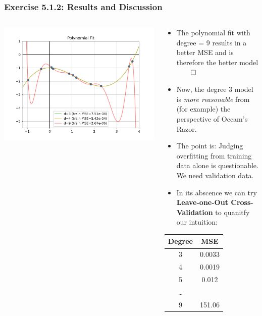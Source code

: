 \documentclass[10pt,aspectratio=169,handout]{beamer}
\begin{document}
\begin{frame}
    \frametitle{Exercise 5.1.2: Results and Discussion}

    \begin{columns}
    \begin{column}{0.4\textwidth}
        \includegraphics[width=1.2\textwidth]{images/task-5-1-2.png}
    \end{column}
    \begin{column}{0.6\textwidth}
        \begin{itemize}
            \item The polynomial fit with degree = 9 results in a better MSE and is therefore the better model $\qed$
            \item Now, the degree 3 model is \textit{more reasonable} from (for example) the perspective of Occam's Razor.
            \item The point is: Judging overfitting from training data alone is questionable. We need validation data.
            \item In its abscence we can try \textbf{Leave-one-Out Cross-Validation} to quanitfy our intuition: \\
        \end{itemize}
        \begin{table}[]
            \begin{tabular}{c|c}
            Degree & MSE \\ \hline
            3      &  0.0033   \\
            4      &  0.0019   \\
            5      &  0.012    \\
            \dots              \\
            9      &  151.06  
            \end{tabular}
            \end{table}
    \end{column}
    

\end{columns}
\end{frame}
\end{document}
